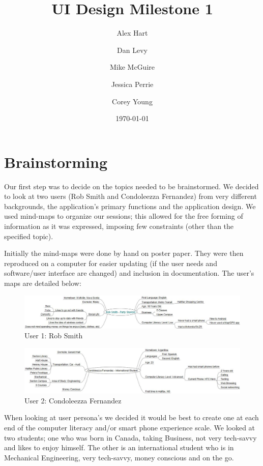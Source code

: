 \documentclass{article}
\title{UI Design Milestone 1}
\author{
    Alex Hart \and Dan Levy \and Mike McGuire
    \and Jessica Perrie \and Corey Young 
}
\date{\today}
\begin{document}
\maketitle

\section{Brainstorming}
Our first step was to decide on the topics needed to be brainstormed. We decided
to look at two users (Rob Smith and Condoleezza Fernandez) from very different
backgrounds, the application's primary functions and the application design.
We used mind-maps to organize our sessions; this allowed for the free forming of
information as it was expressed, imposing few constraints (other than the
specified topic). 

Initially the mind-maps were done by hand on poster paper. They were then
reproduced on a computer for easier updating (if the user needs and software/user
interface are changed) and inclusion in documentation. The user's maps are
detailed below:

\begin{figure}
\includegraphics[width=\textwidth]{img/Rob.jpg}
\caption{User 1: Rob Smith}
\end{figure}

\begin{figure}
\includegraphics[width=\textwidth]{img/Condoleezza.jpg}
\caption{User 2: Condoleezza Fernandez}
\end{figure}

When looking at user persona's we decided it would be best to create one at each
end of the computer literacy and/or smart phone experience scale. We looked at
two students; one who was born in Canada, taking Business, not very tech-savvy
and likes to enjoy himself. The other is an international student who is in
Mechanical Engineering, very tech-savvy, money conscious and on the go.
\end{document}
